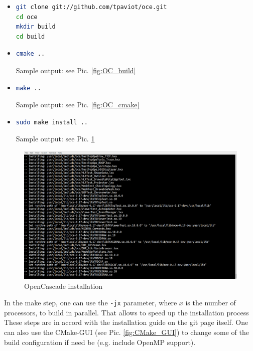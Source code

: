 \documentclass[11pt,a4paper,article,bibtotoc,idxtotoc,headsepline,footsepline,footexclude,DIV13,oneside]{scrbook}
\begin{document}
\begin{itemize}
\item \begin{lstlisting}[language=bash]
git clone git://github.com/tpaviot/oce.git
cd oce
mkdir build
cd build
\end{lstlisting}
	
\item 
\begin{lstlisting}[language=bash]
cmake .. 
\end{lstlisting}	
Sample output: see Pic. \ref{fig:OC_build}
\item 
\begin{lstlisting}[language=bash]
make .. 
\end{lstlisting}	
Sample output: see Pic. \ref{fig:OC_cmake}
\item 
\begin{lstlisting}[language=bash]
sudo make install .. 
\end{lstlisting}	
Sample output: see Pic. \ref{fig:OC_install}
\end{itemize}

\begin{figure}
\centering
\includegraphics[scale=0.3]{img/OC_Install2.png}
\caption{OpenCascade installation}
\label{fig:OC_install}
\end{figure}
	In the make step, one can use the \texttt{-jx} parameter, where $x$ is the number of processors, to build in parallel. That allows to speed up the installation process These steps are in accord with the installation guide on the git page itself. One can also use the CMake-GUI (see Pic. \ref{fig:CMake_GUI}) to change some of the build configuration if need be (e.g. include OpenMP support).
	
\end{document}
